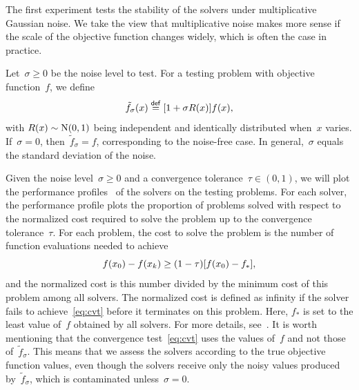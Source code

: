 \documentclass[
    smallextended,  %
    final,        %
]{svjour3}
\newcommand{\NN}{\mathrm{N}}
\newcommand{\eqdef}{\mathrel{\stackrel{\mathsf{def}}{=}}}
\newcommand{\iter}[1][k]{x\ifthenelse{\equal{#1}{}}{}{_{#1}}}
\newcommand{\obj}{f}
\begin{document}

The first experiment tests the stability of the solvers under multiplicative Gaussian noise.
We take the view that multiplicative noise makes more sense if the scale of the objective
function changes widely, which is often the case in practice.

Let~$\sigma \ge 0$ be the noise level to test. For a testing problem with objective function~$\obj$,
we define
\begin{equation}
    \label{eq:noisy-obj}
    \tilde{\obj}_\sigma(\iter[]) \eqdef [1 + \sigma R(\iter[])] \obj(\iter[]),
\end{equation}
with $R(\iter[])\sim \NN(0, 1)$ being independent and identically distributed when~$x$ varies.
If~$\sigma = 0$, then~$\tilde{f}_\sigma = f$, corresponding to the noise-free case.
In general,~$\sigma$ equals the standard deviation of the noise.

Given the noise level~$\sigma\ge 0$ and a convergence tolerance~$\tau\in(0,1)$, we will plot the
performance profiles~\cite{Dolan_More_2002,More_Wild_2009} of the solvers on the testing problems.
For each solver, the performance profile plots the proportion of problems solved with respect to the
normalized cost required to solve the problem up to the convergence tolerance~$\tau$.
For each problem, the cost to solve the problem is the number of function evaluations needed to achieve
\begin{equation}
    \label{eq:cvt}
    \obj(\iter[0]) - \obj(\iter) \ge (1 - \tau) [\obj(\iter[0]) - \obj_{\ast}],
\end{equation}
and the normalized cost is this number divided by the minimum cost of this problem among all solvers.
The normalized cost is defined as infinity if the solver fails to achieve~\eqref{eq:cvt} before it
terminates on this problem.
Here, $\obj_{\ast}$ is set to the least value of~$\obj$ obtained by all solvers.
For more details, see~\cite[\S~2.1]{More_Wild_2009}.
It is worth mentioning that the convergence test~\eqref{eq:cvt} uses the values of~$\obj$ and not
those of~$\tilde{\obj}_\sigma$.
This means that we assess the solvers according to the true objective function values, even though the
solvers receive only the noisy values produced by~$\tilde{\obj}_\sigma$, which is contaminated unless~$\sigma = 0$.
\end{document}
